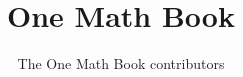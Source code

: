 \documentclass[11pt,a4paper,twoside,openany]{book}
\title{One Math Book}
\author{The One Math Book contributors}
\date{\bookdate}
\begin{document}
\frontmatter



\tableofcontents

\mainmatter



\appendix
\part{\omsolutionspart}


\backmatter
\printindex
\end{document}
